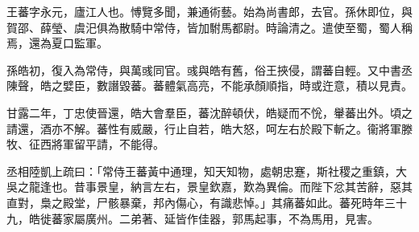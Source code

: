 \begin{pinyinscope}
 
 
 王蕃字永元，廬江人也。愽覽多聞，兼通術藝。始為尚書郎，去官。孫休即位，與賀邵、薛瑩、虞汜俱為散騎中常侍，皆加駙馬都尉。時論清之。遣使至蜀，蜀人稱焉，還為夏口監軍。
 
 
 
 
 孫皓初，復入為常侍，與萬彧同官。彧與皓有舊，俗王挾侵，謂蕃自輕。又中書丞陳聲，皓之嬖臣，數譖毀蕃。蕃體氣高亮，不能承顏順指，時或迕意，積以見責。
 
 
 
 
 甘露二年，丁忠使晉還，皓大會羣臣，蕃沈醉頓伏，皓疑而不恱，轝蕃出外。頃之請還，酒亦不解。蕃性有威嚴，行止自若，皓大怒，呵左右於殿下斬之。衞將軍滕牧、征西將軍留平請，不能得。
 
 
 
 
 
 
 丞相陸凱上疏曰：「常侍王蕃黃中通理，知天知物，處朝忠蹇，斯社稷之重鎮，大吳之龍逢也。昔事景皇，納言左右，景皇欽嘉，歎為異倫。而陛下忿其苦辭，惡其直對，梟之殿堂，尸骸暴棄，邦內傷心，有識悲悼。」其痛蕃如此。蕃死時年三十九，皓徙蕃家屬廣州。二弟著、延皆作佳器，郭馬起事，不為馬用，見害。
 
 
\end{pinyinscope}